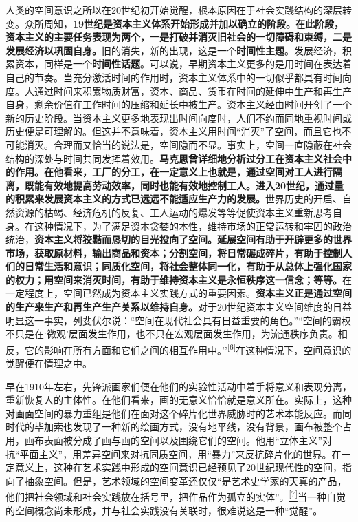 \documentclass[UTF8, fontset = sourcesans, a4paper, oneside, zihao =
-4, scheme=chinese, no-math, space=true]{ctexbook}
\begin{document}
人类的空间意识之所以在20世纪初开始觉醒，根本原因在于社会实践结构的深层转变。众所周知，\textbf{19世纪是资本主义体系开始形成并加以确立的阶段。在此阶段，资本主义的主要任务表现为两个，一是打破并消灭旧社会的一切障碍和束缚，二是发展经济以巩固自身。}旧的消失，新的出现，这是一个\textbf{时间性主题}。发展经济，积累资本，同样是一个\textbf{时间性话题}。可以说，早期资本主义更多的是用时间在表达着自己的节奏。当充分激活时间的作用时，资本主义体系中的一切似乎都具有时间向度。人通过时间来积累物质财富，资本、商品、货币在时间的延伸中生产和再生产自身，剩余价值在工作时间的压缩和延长中被生产。资本主义经由时间开创了一个新的历史阶段。当资本主义更多地表现出时间向度时，人们不约而同地重视时间或历史便是可理解的。但这并不意味着，资本主义用时间``消灭''了空间，而且它也不可能消灭。合理而又恰当的说法是，空间隐而不显。事实上，空间一直隐蔽在社会结构的深处与时间共同发挥着效用。\textbf{马克思曾详细地分析过分工在资本主义社会中的作用。在他看来，工厂的分工，在一定意义上也就是，通过空间对工人进行隔离，既能有效地提高劳动效率，同时也能有效地控制工人。进入20世纪，通过量的积累来发展资本主义的方式已远远不能适应生产力的发展。}世界历史的开启、自然资源的枯竭、经济危机的反复、工人运动的爆发等等促使资本主义重新思考自身。在这种情况下，为了满足资本贪婪的本性，维持市场的正常运转和牢固的政治统治，\textbf{资本主义将狡黠而恳切的目光投向了空间。延展空间有助于开辟更多的世界市场，获取原材料，输出商品和资本；分割空间，将日常碾成碎片，有助于控制人们的日常生活和意识；同质化空间，将社会整体同一化，有助于从总体上强化国家的权力；用空间来消灭时间，有助于维持资本主义是永恒秩序这一信念；等等。}在一定程度上，空间已然成为资本主义实践方式的重要因素。\textbf{资本主义正是通过空间的生产来生产和再生产生产关系以维持自身。}对于20世纪资本主义空间维度的日益明显这一事实，列斐伏尔说：``空间在现代社会具有日益重要的角色。''``空间的霸权不只是在`微观'层面发生作用，也不只在宏观层面发生作用，为流通秩序负责。相反，它的影响在所有方面和它们之间的相互作用中。''\protect\hypertarget{part0006_split_001.htmlux5cux23w6}{}{}\protect\hyperlink{part0006_split_003.htmlux5cux23m6}{\textsuperscript{{[}6{]}}}在这种情况下，空间意识的觉醒便在情理之中。

早在1910年左右，先锋派画家们便在他们的实验性活动中着手将意义和表现分离，重新恢复人的主体性。在他们看来，画的无意义恰恰就是意义所在。实际上，这种对画面空间的暴力重组是他们在面对这个碎片化世界威胁时的艺术本能反应。而同时代的毕加索也发现了一种新的绘画方式，没有地平线，没有背景，画布被整个占用，画布表面被分成了画与画的空间以及围绕它们的空间。他用``立体主义''对抗``平面主义''，用差异空间来对抗同质空间，用``暴力''来反抗碎片化的世界。在一定意义上，这种在艺术实践中形成的空间意识已经预见了20世纪现代性的空间，指向了抽象空间。但是，艺术领域的空间变革还仅仅``是艺术史学家的天真的产品，他们把社会领域和社会实践放在括号里，把作品作为孤立的实体''。\protect\hypertarget{part0006_split_001.htmlux5cux23w7}{}{}\protect\hyperlink{part0006_split_003.htmlux5cux23m7}{\textsuperscript{{[}7{]}}}当一种自觉的空间概念尚未形成，并与社会实践没有关联时，很难说这是一种``觉醒''。
\end{document}
